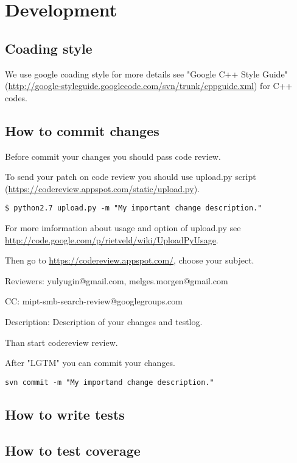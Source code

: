 \chapter{Development}

\section{Coading style}

We use google coading style for more details see "Google C++ Style Guide" (\url{http://google-styleguide.googlecode.com/svn/trunk/cppguide.xml}) for C++ codes.

\section{How to commit changes}

Before commit your changes you should pass code review.

To send your patch on code review you should use upload.py script (\url{https://codereview.appspot.com/static/upload.py}).

\begin{lstlisting}
$ python2.7 upload.py -m "My important change description."
\end{lstlisting}

For more imformation about usage and option of upload.py see \url{http://code.google.com/p/rietveld/wiki/UploadPyUsage}.

Then go to \url{https://codereview.appspot.com/}, choose your subject.

Reviewers: yulyugin@gmail.com, melges.morgen@gmail.com

CC: mipt-smb-search-review@googlegroups.com

Description: Description of your changes and testlog.

Than start codereview review.

After "LGTM" you can commit your changes.

\begin{lstlisting}
svn commit -m "My importand change description."
\end{lstlisting}

\section{How to write tests}

\section{How to test coverage}

